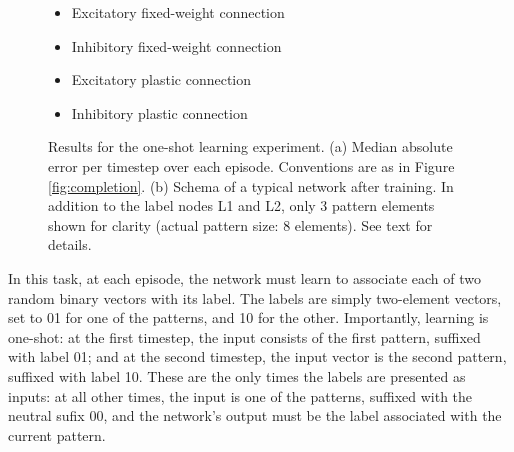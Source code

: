 \documentclass{article}
\begin{document}
\begin{figure}
\begin{subfigure}[t]{0.4\textwidth}
\end{subfigure}
\begin{minipage}[b]{0.2\textwidth}
\noindent
\small
\begin{itemize}[leftmargin=*] %
\item[]\tikz{\path[very thick,->,draw=black] %
        (0,0) -- (1,0) ;}Excitatory fixed-weight connection
\item[]\tikz{\path[very thick,->,draw=blue] %
        (0,0) -- (1,0) ;}Inhibitory fixed-weight connection
\item[]\tikz{\path[very thick,->,dashed,draw=black] %
        (0,0) -- (1,0) ;}Excitatory plastic connection
\item[]\tikz{\path[very thick,->,dashed,draw=blue] %
        (0,0) -- (1,0) ;}Inhibitory plastic connection
\end{itemize}
\end{minipage}

\caption{Results for the one-shot learning experiment. (a) Median absolute error
    per timestep over each episode. Conventions are as in Figure
    \ref{fig:completion}.
(b) Schema of a
typical network after training. In addition to the label nodes L1 and L2, only 3 pattern elements shown for clarity (actual
pattern size: 8 elements). See text for details.}
\label{fig:oneshot}
\end{figure}


In this task, at each episode, the network must learn to associate each of two
random binary vectors with its label. The labels are simply two-element vectors,
set to 01 for one of the
patterns, and 10 for the other. Importantly, learning is one-shot: at the first
timestep, the input consists of the first pattern, suffixed with label 01;
and at the second timestep, the input vector is the second pattern, suffixed
with label 10. These are the only times the labels are presented as inputs: at
all other times, the input is one of the patterns, suffixed with the neutral
sufix 00, and the network's output must be the label associated with the current
pattern.
\end{document}
